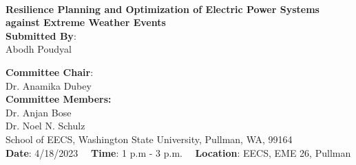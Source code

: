 \documentclass[hidelinks, 12pt]{article}
\begin{document}
\begin{titlepage}

\HRule \\
{ \Large \bfseries Resilience Planning and Optimization of Electric Power Systems against Extreme Weather Events}
\vspace{0.2 cm}
\HRule \\
 


\medskip
\large
{{\textbf{Submitted By}:\\ Abodh Poudyal }}\\ [0.5cm]

\medskip

\textbf{Committee Chair}:\\ Dr. Anamika Dubey \\ [0.5 cm]
\textbf{Committee Members:} \\ Dr. Anjan Bose\\
Dr. Noel N. Schulz\\

\vspace{1.5 cm}
\small School of EECS, Washington State University, Pullman, WA, 99164\\

\vspace{1.0 cm}
\small
\textbf{Date}: 4/18/2023 \ \ \textbf{Time}: 1 p.m - 3 p.m. \ \ \textbf{Location}: EECS, EME 26, Pullman


\vfill %
\end{titlepage}

\newpage


\newpage
\tableofcontents
\newpage







\newpage

\end{document}
